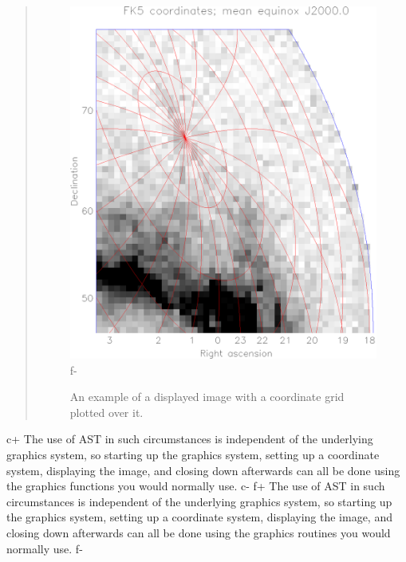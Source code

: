 \documentclass[twoside,11pt]{article}
\begin{document}
\begin{htmlonly}
\begin{quote}
\begin{figure}[bhtp]
   \includegraphics[scale=0.8]{sun210_figures/overgrid.eps}
f-
   \caption{An example of a displayed image with a coordinate grid
   plotted over it.}
   \end{figure}
   \end{quote}
\end{htmlonly}
c+
The use of AST in such circumstances is independent of the underlying
graphics system, so starting up the graphics system, setting up a
coordinate system, displaying the image, and closing down afterwards
can all be done using the graphics functions you would normally use.
c-
f+
The use of AST in such circumstances is independent of the underlying
graphics system, so starting up the graphics system, setting up a
coordinate system, displaying the image, and closing down afterwards
can all be done using the graphics routines you would normally use.
f-
\end{document}
